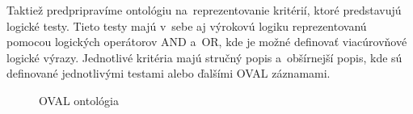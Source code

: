 \documentclass[12pt, a4paper, oneside]{book}
\begin{document}
Taktiež predpripravíme ontológiu na~reprezentovanie kritérií, ktoré predstavujú logické testy. Tieto testy majú v~sebe aj výrokovú logiku reprezentovanú pomocou logických operátorov AND a~OR, kde je možné definovať viacúrovňové logické výrazy. Jednotlivé kritéria majú stručný popis a~obšírnejší popis, kde sú definované jednotlivými testami alebo ďalšími OVAL záznamami.


\begin{figure}[!hb]
\label{fig:ovalOnto}
\caption{OVAL ontológia}
\end{figure}
\end{document}
